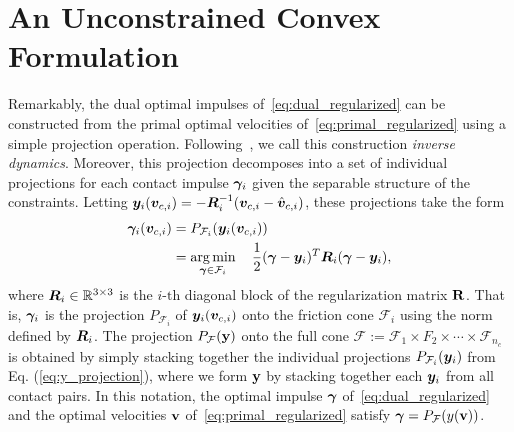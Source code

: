 \section{An Unconstrained Convex Formulation}
\label{sec:unconstrained_convex_formulation}
Remarkably,  the dual optimal impulses of~\eqref{eq:dual_regularized} can be constructed from 
the primal optimal velocities of~\eqref{eq:primal_regularized}
using a simple projection operation. 
 Following~\cite{bib:todorov2014}, we call this construction  \textit{inverse dynamics}. 
 Moreover, this projection
decomposes into a set of individual projections for each
contact impulse ${\bm\gamma}_i$ given the separable structure of the constraints.
Letting ${\bm{y}}_i({\bm{v}}_{c,i}) = -{\bm{R}}_i^{-1}({\bm{v}}_{c,i}-\hat{{\bm{v}}}_{c,i})$,
these projections take the form
\begin{equation}
  \begin{aligned}
	\bgamma_i(\vf{v}_{c,i})&= P_{\mathcal{F}_i}(\vf{y}_i(\vf{v}_{c,i}))\\
	&= \argmin_{\bgamma\in\mathcal{F}_i} \quad 
		\frac{1}{2}(\bgamma-\vf{y}_i)^T\vf{R}_i(\bgamma-\vf{y}_i),\\
	\end{aligned}
	\label{eq:y_projection}
\end{equation}
where ${\bm{R}}_i\in\mathbb{R}^{3\times3}$ is the $i\text{-th}$ diagonal block of
the regularization matrix ${\mathbf{R}}$. That is, ${\bm\gamma}_i$ is the projection
$P_{\mathcal{F}_i}$ of ${\bm{y}}_i({\bm{v}}_{c,i})$ onto the friction cone
$\mathcal{F}_i$ using the norm defined by ${\bm{R}}_i$.
The projection $P_{\mathcal{F}}({\mathbf{y}})$ onto 
the full cone $\mathcal{F} :=
\mathcal{F}_1 \times F_2 \times \cdots \times \mathcal{F}_{n_c}$ 
is obtained by simply stacking together the individual projections
$P_{\mathcal{F}_i}({\bm{y}}_i)$ from Eq. (\ref{eq:y_projection}),
where we form ${\mathbf{y}}$ by stacking together each
${\bm{y}}_i$ from all contact pairs.  In this notation,
the optimal impulse ${\bm\gamma}$ of~\eqref{eq:dual_regularized} 
and the optimal velocities ${\mathbf{v}}$ of~\eqref{eq:primal_regularized} 
satisfy  ${\bm\gamma} = P_{\mathcal{F}}(y({\mathbf{v}}))$.


